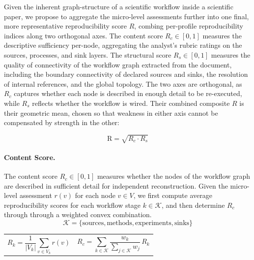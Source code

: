 \documentclass{article}
\begin{document}
Given the inherent graph-structure of a scientific workflow inside a scientific paper, we propose to aggregate the micro-level assessments further into one final, more representative reproducibility score $R$, combing per-profile reproducibility indices along two orthogonal axes.
The content score $R_c \in [0,1]$ measures the descriptive sufficiency per-node, aggregating the analyst's rubric ratings on the sources, processes, and sink layers. 
The structural score $R_s \in [0,1]$ measures the quality of connectivity of the workflow graph extracted from the document, including the boundary connectivity of declared sources and sinks, the resolution of internal references, and the global topology. 
The two axes are orthogonal, as $R_c$ captures whether each node is described in enough detail to be re-executed, while $R_s$ reflects whether the workflow is wired.
Their combined composite $R$ is their geometric mean, chosen so that weakness in either axis cannot be compensated by strength in the other:

\begin{equation}
    \text{R} = \sqrt{R_c \cdot R_s}
\end{equation}

\paragraph{Content Score.}         

The content score $R_c\in[0,1]$ measures whether the nodes of the workflow graph are described in sufficient detail for independent reconstruction.
Given the micro-level assessment $r(v)$ for each node $v\in V$, we first compute average reproducibility scores for each workflow stage $k\in\mathcal{K}$, and then determine $R_c$ through through a weighted convex combination.
\begin{equation}
    \mathcal{K}=\{\text{sources},\text{methods},\text{experiments},\text{sinks}\}
\end{equation}
%

{\renewcommand{\arraystretch}{0}%
\begin{table}[!h]
    \centering
    \begin{tabularx}{1.014\textwidth}{XX}

\begin{equation}
R_k
=
\frac{1}{|V_k|}
\sum_{v\in V_k} r(v)
\end{equation}

&

\begin{equation}
R_c
=
\sum_{k\in \mathcal{K}}
\frac{w_k}{\sum_{j\in \mathcal{K}} w_j}
\, R_k
\end{equation}

    \end{tabularx}
\end{table}
}
\end{document}
